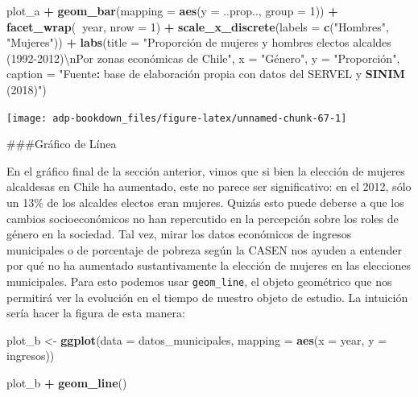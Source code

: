 \documentclass[]{book}
\newenvironment{Shaded}{\begin{snugshade}}{\end{snugshade}}
\newcommand{\CharTok}[1]{\textcolor[rgb]{0.31,0.60,0.02}{#1}}
\newcommand{\DataTypeTok}[1]{\textcolor[rgb]{0.13,0.29,0.53}{#1}}
\newcommand{\DecValTok}[1]{\textcolor[rgb]{0.00,0.00,0.81}{#1}}
\newcommand{\KeywordTok}[1]{\textcolor[rgb]{0.13,0.29,0.53}{\textbf{#1}}}
\newcommand{\NormalTok}[1]{#1}
\newcommand{\OperatorTok}[1]{\textcolor[rgb]{0.81,0.36,0.00}{\textbf{#1}}}
\newcommand{\StringTok}[1]{\textcolor[rgb]{0.31,0.60,0.02}{#1}}
\begin{document}
\begin{Shaded}
\begin{Highlighting}[]
\NormalTok{plot_a }\OperatorTok{+}\StringTok{ }
\StringTok{  }\KeywordTok{geom_bar}\NormalTok{(}\DataTypeTok{mapping =} \KeywordTok{aes}\NormalTok{(}\DataTypeTok{y =}\NormalTok{ ..prop.., }\DataTypeTok{group =} \DecValTok{1}\NormalTok{)) }\OperatorTok{+}
\StringTok{  }\KeywordTok{facet_wrap}\NormalTok{(}\OperatorTok{~}\NormalTok{year, }\DataTypeTok{nrow =} \DecValTok{1}\NormalTok{) }\OperatorTok{+}
\StringTok{  }\KeywordTok{scale_x_discrete}\NormalTok{(}\DataTypeTok{labels =} \KeywordTok{c}\NormalTok{(}\StringTok{"Hombres"}\NormalTok{, }\StringTok{"Mujeres"}\NormalTok{)) }\OperatorTok{+}
\StringTok{  }\KeywordTok{labs}\NormalTok{(}\DataTypeTok{title =} \StringTok{"Proporción de mujeres y hombres electos alcaldes (1992-2012)}\CharTok{\textbackslash{}n}\StringTok{Por zonas económicas de Chile"}\NormalTok{, }
       \DataTypeTok{x =} \StringTok{"Género"}\NormalTok{, }\DataTypeTok{y =} \StringTok{"Proporción", }
\StringTok{       caption = "}\NormalTok{Fuente}\OperatorTok{:}\StringTok{ }\NormalTok{base de elaboración propia con datos del SERVEL y }\KeywordTok{SINIM}\NormalTok{ (}\DecValTok{2018}\NormalTok{)}\StringTok{")}
\end{Highlighting}
\end{Shaded}

\begin{center}\texttt{[image: adp-bookdown\_files/figure-latex/unnamed-chunk-67-1]} \end{center}

\#\#\#Gráfico de Línea

En el gráfico final de la sección anterior, vimos que si bien la
elección de mujeres alcaldesas en Chile ha aumentado, este no parece ser
significativo: en el 2012, sólo un 13\% de los alcaldes electos eran
mujeres. Quizás esto puede deberse a que los cambios socioeconómicos no
han repercutido en la percepción sobre los roles de género en la
sociedad. Tal vez, mirar los datos económicos de ingresos municipales o
de porcentaje de pobreza según la CASEN nos ayuden a entender por qué no
ha aumentado sustantivamente la elección de mujeres en las elecciones
municipales. Para esto podemos usar \texttt{geom\_line}, el objeto
geométrico que nos permitirá ver la evolución en el tiempo de nuestro
objeto de estudio. La intuición sería hacer la figura de esta manera:

\begin{Shaded}
\begin{Highlighting}[]
\NormalTok{plot_b <-}\StringTok{ }\KeywordTok{ggplot}\NormalTok{(}\DataTypeTok{data    =}\NormalTok{ datos_municipales, }
                 \DataTypeTok{mapping =} \KeywordTok{aes}\NormalTok{(}\DataTypeTok{x =}\NormalTok{ year, }\DataTypeTok{y =}\NormalTok{ ingresos)) }

\NormalTok{plot_b }\OperatorTok{+}\StringTok{ }
\StringTok{  }\KeywordTok{geom_line}\NormalTok{()}
\end{Highlighting}
\end{Shaded}
\end{document}
